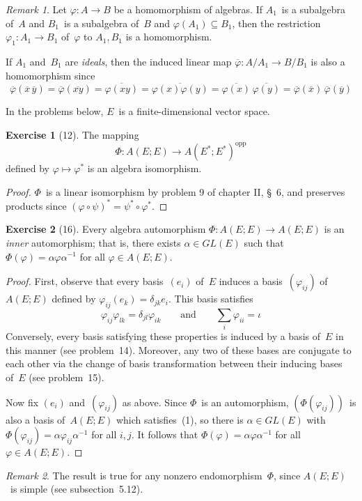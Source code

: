 \documentclass[letterpaper,12pt]{article}
\newcommand{\after}{\circ}
\newcommand{\opp}[1]{#1^{\mathrm{opp}}}
\newcommand{\proj}[1]{\overline{#1}}
\theoremstyle{definition}
\newtheorem*{exer}{Exercise}
\theoremstyle{remark}
\newtheorem*{rmk}{Remark}
\begin{document}
\begin{rmk}
Let \(\varphi:A\to B\) be a homomorphism of algebras. If \(A_1\)~is a subalgebra of~\(A\) and \(B_1\)~is a subalgebra of~\(B\) and \(\varphi(A_1)\subseteq B_1\), then the restriction \(\varphi_1:A_1\to B_1\) of~\(\varphi\) to \(A_1,B_1\) is a homomorphism.

If \(A_1\) and~\(B_1\) are \emph{ideals}, then the induced linear map \(\proj{\varphi}:A/A_1\to B/B_1\) is also a homomorphism since
\[\proj{\varphi}(\proj{x}\,\proj{y})=\proj{\varphi}(\proj{xy})=\proj{\varphi(xy)}=\proj{\varphi(x)\varphi(y)}=\proj{\varphi(x)}\,\proj{\varphi(y)}=\proj{\varphi}(\proj{x})\,\proj{\varphi}(\proj{y})\]
\end{rmk}

\noindent In the problems below, \(E\)~is a finite-dimensional vector space.
\begin{exer}[12]
The mapping
\[\Phi:A(E;E)\to\opp{A(E^*;E^*)}\]
defined by \(\varphi\mapsto\varphi^*\) is an algebra isomorphism.
\end{exer}
\begin{proof}
\(\Phi\)~is a linear isomorphism by problem 9 of chapter II, \S~6, and preserves products since \((\varphi\after\psi)^*=\psi^*\after\varphi^*\).
\end{proof}

\begin{exer}[16]
Every algebra automorphism \(\Phi:A(E;E)\to A(E;E)\) is an \emph{inner} automorphism; that is, there exists \(\alpha\in GL(E)\) such that \(\Phi(\varphi)=\alpha\varphi\alpha^{-1}\) for all \(\varphi\in A(E;E)\).
\end{exer}
\begin{proof}
First, observe that every basis~\((e_i)\) of~\(E\) induces a basis~\((\varphi_{ij})\) of~\(A(E;E)\) defined by \(\varphi_{ij}(e_k)=\delta_{jk}e_i\). This basis satisfies
\[\varphi_{ij}\varphi_{lk}=\delta_{jl}\varphi_{ik}\qquad\text{and}\qquad\sum_i\varphi_{ii}=\iota\tag{1}\]
Conversely, every basis satisfying these properties is induced by a basis of~\(E\) in this manner (see problem~14). Moreover, any two of these bases are conjugate to each other via the change of basis transformation between their inducing bases of~\(E\) (see problem~15).

Now fix \((e_i)\) and~\((\varphi_{ij})\) as above. Since \(\Phi\)~is an automorphism, \((\Phi(\varphi_{ij}))\)~is also a basis of~\(A(E;E)\) which satisfies~(1), so there is \(\alpha\in GL(E)\) with \(\Phi(\varphi_{ij})=\alpha\varphi_{ij}\alpha^{-1}\) for all \(i,j\). It follows that \(\Phi(\varphi)=\alpha\varphi\alpha^{-1}\) for all \(\varphi\in A(E;E)\).
\end{proof}
\begin{rmk}
The result is true for any nonzero endomorphism~\(\Phi\), since \(A(E;E)\)~is simple (see subsection~5.12).
\end{rmk}
\end{document}
